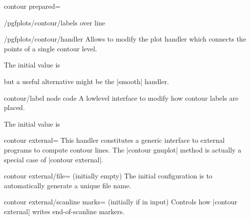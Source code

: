 {{\begin{plottype}[/pgfplots]{contour prepared=\textcolor{black}{}}
\begin{stylekey}{/pgfplots/contour/labels over line}
\begin{codeexample}[]
\end{codeexample}
	\end{stylekey}

	\begin{stylekey}{/pgfplots/contour/handler}
		Allows to modify the plot handler which connects the points of a single contour level.

		The initial value is 
\begin{codeexample}
\end{codeexample}
		but a useful alternative might be the |smooth| handler.
	\end{stylekey}

	\begin{pgfplotscodekey}{contour/label node code}
		A lowlevel interface to modify how contour labels are placed.

		The initial value is
\begin{codeexample}
\end{codeexample}
	\end{pgfplotscodekey}

\end{plottype}


\begin{plottype}[/pgfplots]{contour external=\textcolor{black}{}}
	This handler constitutes a generic interface to external programs to compute contour lines. The |contour gnuplot| method is actually a special case of |contour external|.

	\begin{pgfplotskey}{contour external/file= (initially empty)}
		The initial configuration is to automatically generate a unique file name.
	\end{pgfplotskey}

	\begin{pgfplotskey}{contour external/scanline marks= (initially if in input)}
		Controls how |contour external| writes end-of-scanline markers. 


\end{pgfplotskey}
\end{plottype}}}
